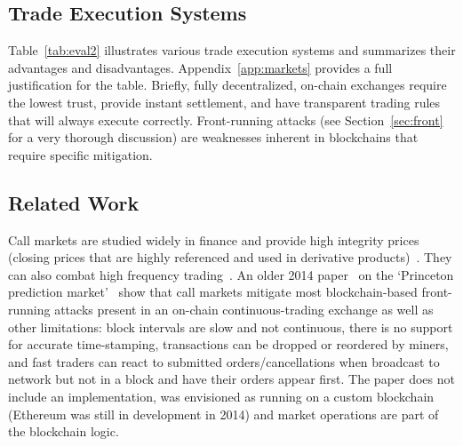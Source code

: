 \subsection{Trade Execution Systems}



Table~\ref{tab:eval2} illustrates various trade execution systems and summarizes their advantages and disadvantages. Appendix~\ref{app:markets} provides a full justification for the table. Briefly, fully decentralized, on-chain exchanges require the lowest trust, provide instant settlement, and have transparent trading rules that will always execute correctly. Front-running attacks (see Section~\ref{sec:front} for a very thorough discussion) are weaknesses inherent in blockchains that require specific mitigation.  

\subsection{Related Work}

Call markets are studied widely in finance and provide high integrity prices (\eg closing prices that are highly referenced and used in derivative products)~\cite{HS04,PS03,FH21}. They can also combat high frequency trading~\cite{budish2015high,aquilina2020quantifying}. An older 2014 paper~\cite{clark2014decentralizing} on the `Princeton prediction market'~\cite{Bra13} show that call markets  mitigate most blockchain-based front-running attacks present in an on-chain continuous-trading exchange as well as other limitations: block intervals are slow and not continuous, there is no support for accurate time-stamping, transactions can be dropped or reordered by miners, and fast traders can react to submitted orders/cancellations when broadcast to network but not in a block and have their orders appear first. The paper does not include an implementation, was envisioned as running on a custom blockchain (Ethereum was still in development in 2014) and market operations are part of the blockchain logic. 

